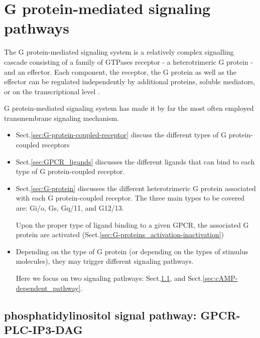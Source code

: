 \section{G protein-mediated signaling pathways}
\label{sec:G_protein_mediated-signaling-pathways}

The G protein-mediated signaling system is a relatively complex signalling
cascade consisting of a family of GTPases receptor - a heterotrimeric G protein
- and an effector. Each component, the receptor, the G protein as well as the
effector can be regulated independently by additional proteins, soluble
mediators, or on the transcriptional level \citep{Wettschureck2005}.


G protein-mediated signaling system has made it by far the most often
employed transmembrane signaling mechanism. 
\begin{itemize}
  \item Sect.\ref{sec:G-protein-coupled-receptor} discuss the different types
  of G protein-coupled receptors

  \item Sect.\ref{sec:GPCR_ligands} discusses the different ligands that can
  bind to each type of G protein-coupled receptor.
  
  \item Sect.\ref{sec:G-protein} discusses the different heterotrimeric G
  protein associated with each G protein-coupled receptor.
  The three main types to be covered are: Gi/o, Gs, Gq/11, and G12/13.
   
    
   Upon the proper type of ligand binding to a given GPCR, the associated G
   protein are activated (Sect.\ref{sec:G-proteins_activation-inactivation})
   
  \item Depending on the type of G protein (or depending on the types of
  stimulus molecules), they may trigger different signaling pathways.

  Here we focus on two signaling pathways:  
  Sect.\ref{sec:phosphatidylinositol-signal-pathway}, 
  and Sect.\ref{sec:cAMP-dependent_pathway}.
\end{itemize}

\subsection{phosphatidylinositol signal pathway: GPCR-PLC-IP3-DAG}
\label{sec:phosphatidylinositol-signal-pathway}
\label{sec:GPCR-PLC-IP3-DAG-pathway}

